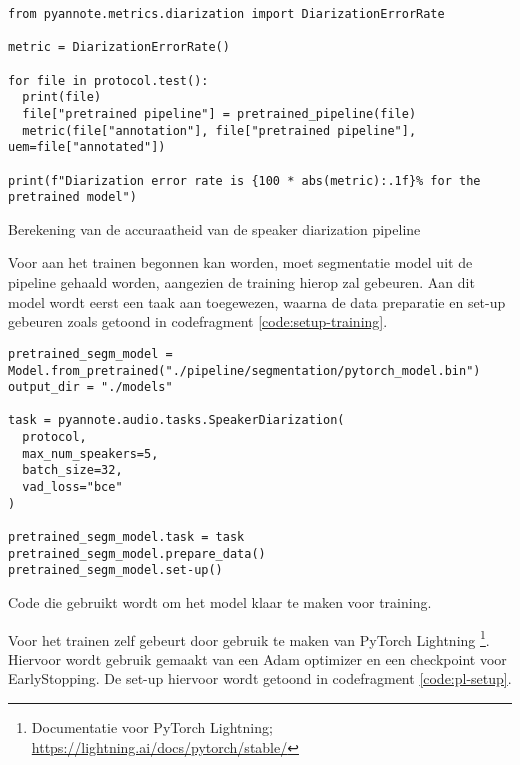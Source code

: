 \begin{listing}
	\begin{verbatim}
from pyannote.metrics.diarization import DiarizationErrorRate

metric = DiarizationErrorRate()

for file in protocol.test():
  print(file)
  file["pretrained pipeline"] = pretrained_pipeline(file)
  metric(file["annotation"], file["pretrained pipeline"], uem=file["annotated"])

print(f"Diarization error rate is {100 * abs(metric):.1f}% for the pretrained model")
	\end{verbatim}
	\caption[Berekening DER met pyannote-metrics]{\label{code:pyannote-metrics}Berekening van de accuraatheid van de speaker diarization pipeline}
\end{listing}

Voor aan het trainen begonnen kan worden, moet segmentatie model uit de pipeline gehaald worden, aangezien de training hierop zal gebeuren. Aan dit model wordt eerst een taak aan toegewezen, waarna de data preparatie en set-up gebeuren zoals getoond in codefragment \ref{code:setup-training}.

\begin{listing}
	\begin{verbatim}
pretrained_segm_model = Model.from_pretrained("./pipeline/segmentation/pytorch_model.bin")
output_dir = "./models"

task = pyannote.audio.tasks.SpeakerDiarization(
  protocol,
  max_num_speakers=5,
  batch_size=32,
  vad_loss="bce"
)

pretrained_segm_model.task = task
pretrained_segm_model.prepare_data()
pretrained_segm_model.set-up()
	\end{verbatim}
	\caption[Model klaarmaken voor training]{\label{code:setup-training}Code die gebruikt wordt om het model klaar te maken voor training.}
\end{listing}

Voor het trainen zelf gebeurt door gebruik te maken van PyTorch Lightning \footnote{Documentatie voor PyTorch Lightning; \url{https://lightning.ai/docs/pytorch/stable/}}. Hiervoor wordt gebruik gemaakt van een Adam optimizer en een checkpoint voor EarlyStopping. De set-up hiervoor wordt getoond in codefragment \ref{code:pl-setup}.

